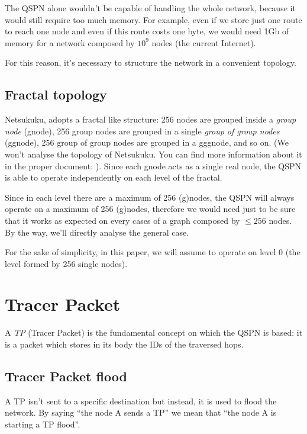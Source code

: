 \documentclass[a4paper]{article}
\begin{document}
The QSPN alone wouldn't be capable of handling the whole network, because it
would still require too much memory. For example, even if we store just one
route to reach one node and even if this route costs one byte, we would need
1Gb of memory for a network composed by $10^9$ nodes (the current Internet).

For this reason, it's necessary to structure the network in a convenient
topology.

\subsection{Fractal topology}
\label{sec:fractal_topology}
Netsukuku, adopts a fractal like structure:
256 nodes are grouped inside a \emph{group node} (gnode), 256 group nodes are grouped
in a single \emph{group of group nodes} (ggnode), 256 group of group nodes are
grouped in a gggnode, and so on.
(We won't analyse the topology of Netsukuku. You can find more information
about it in the proper document: \cite{ntktopology}).
\newline
Since each gnode acts as a single real node,
the QSPN is able to operate independently on each level of the fractal.

Since in each level there are a maximum of 256 (g)nodes, the QSPN will
always operate on a maximum of 256 (g)nodes, therefore we would need just to
be sure that it works as expected on every cases of a graph composed by $\le
256$ nodes. By the way, we'll directly analyse the general case.

For the sake of simplicity, in this paper, we will assume to operate on level
0 (the level formed by 256 single nodes).

\section{Tracer Packet}
\label{sec:TP}

A \emph{TP} (Tracer Packet) is the fundamental concept on which the QSPN is
based: 
it is a packet which stores in its body the IDs of the traversed hops.

\subsection{Tracer Packet flood}
\label{sec:TP_flood}

A TP isn't sent to a specific destination but instead, it is used to flood the
network. By saying ``the node A sends a TP'' we mean that ``the node A is
starting a TP flood''.
\end{document}
